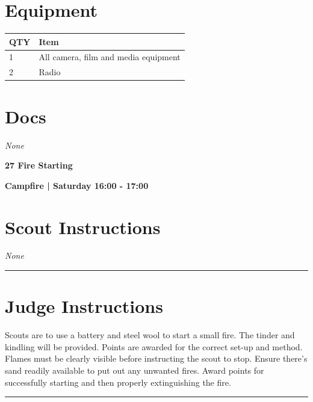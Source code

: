 \documentclass[10pt]{article}
\newcommand{\newtitle}[1]{\begin{center}{\Huge\bfseries #1 }\\ \vspace{5mm}\end{center}}
\newcommand{\newsubtitle}[1]{\begin{center}{\color{grey}\Large\bfseries #1 }\\ \vspace{5mm}\end{center}}
\begin{document}
	\begin{multicols}{2}

		\section*{\faWrench \: Equipment}

		
	\begin{center}
			\begin{tabular}{p{2cm}p{4cm}}


				\textbf{QTY} & \textbf{Item} \\\toprule
												1&All camera, film and media equipment\\\midrule
												2&Radio\\\midrule
								\end{tabular}

			\end{center}

		
		\vfill\null
		\columnbreak

			\section*{\faFile \: Docs}
		 	\textit{None}
	

		\vfill\null

		\end{multicols}



	\vspace{1cm}


	\clearpage
		\newtitle{27 Fire Starting }
	\newsubtitle{Campfire | Saturday 16:00 - 17:00}
		\setcounter{section}{26}
	\section*{Scout Instructions}
		\textit{None}
	
	\vspace{0.5cm}
	\hrule
	\vspace{0.5cm}

		\section*{Judge Instructions}
		Scouts are to use a battery and steel wool to start a small fire. The tinder and kindling will be provided. Points are awarded for the correct set-up and method. Flames must be clearly visible before instructing the scout to stop. Ensure there's sand readily available to put out any unwanted fires. Award points for successfully starting and then properly extinguishing the fire.
\vspace{0.5cm}
	\hrule
	\vspace{0.5cm}
\end{document}
